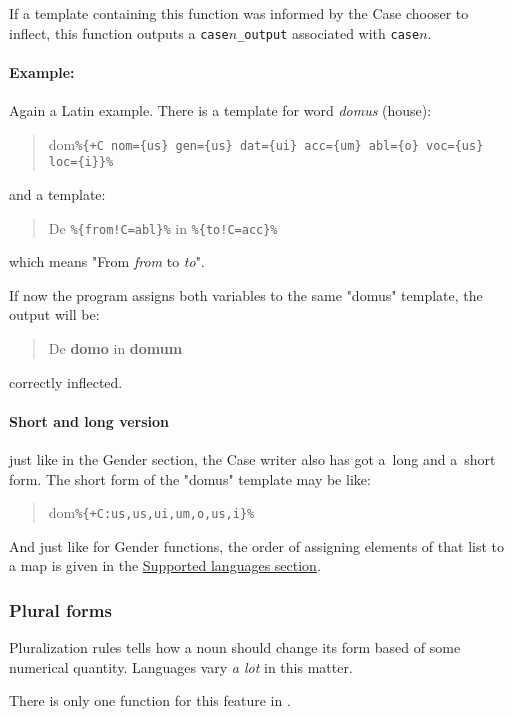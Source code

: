 If a template containing this function was informed by the Case chooser to inflect, this function outputs a \texttt{case$n$\_output} associated with \texttt{case$n$}.

\paragraph{Example:} Again a Latin example. There is a template for word \emph{domus} (house):
\begin{quote}
	dom\verb-%{+C nom={us} gen={us} dat={ui} acc={um} abl={o} voc={us} loc={i}}%-
\end{quote}
and a template:
\begin{quote}
	De \verb+%{from!C=abl}%+ in \verb+%{to!C=acc}%+
\end{quote} which means "From \textit{from} to \textit{to}".

If now the program assigns both variables to the same "domus" template, the output will be:
\begin{quote}
	De \textbf{domo} in \textbf{domum}
\end{quote} correctly inflected.

\paragraph{Short and long version} just like in the Gender section, the Case writer also has got a~long and a~short form.
The short form of the "domus" template may be like:
\begin{quote}
	dom\verb-%{+C:us,us,ui,um,o,us,i}%-
\end{quote}

And just like for Gender functions, the order of assigning elements of that list to a map is given in the \hyperref[supLangs]{Supported languages section}.

\subsubsection{Plural forms}
Pluralization rules tells how a noun should change its form based of some numerical quantity. Languages vary \emph{a lot} in this matter. 

There is only one function for this feature in \mulan{}.

\vspace{1em}
 
